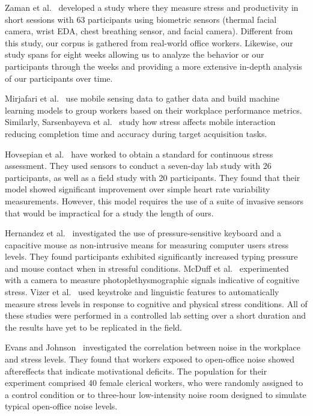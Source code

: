 Zaman et al.~\cite{Zaman19} developed a study where they measure stress and productivity in short sessions with 63 participants using biometric sensors (thermal facial camera, wrist EDA, chest breathing sensor, and facial camera). Different from this study, our corpus is gathered from real-world office workers. Likewise, our study spans for eight weeks allowing us to analyze the behavior or our participants through the weeks and providing a more extensive in-depth analysis of our participants over time.

Mirjafari et al.~\cite{Mirjafari19} use mobile sensing data to gather data and build machine learning models to group workers based on their workplace performance metrics. Similarly, Sarsenbayeva et al.~\cite{Sarsenbayeva19} study how stress affects mobile interaction reducing completion time and accuracy during target acquisition tasks.

Hovsepian et al.~\cite{Hovsepian15} have worked to obtain a standard for continuous stress assessment. They used sensors to conduct a seven-day lab study with 26 participants, as well as a field study with 20 participants. They found that their model showed significant improvement over simple heart rate variability measurements. However, this model requires the use of a suite of invasive sensors that would be impractical for a study the length of ours.

Hernandez et al.~\cite{Hernandez14} investigated the use of pressure-sensitive keyboard and a capacitive mouse as non-intrusive means for measuring computer users stress levels. They found participants exhibited significantly increased typing pressure and mouse contact when in stressful conditions. McDuff et al.~\cite{mcduff16} experimented with a camera to measure photoplethysmographic signals indicative of cognitive stress. Vizer et al.~\cite{vizer_automated_2009} used keystroke and linguistic features to automatically measure stress levels in response to cognitive and physical stress conditions. All of these studies were performed in a controlled lab setting over a short duration and the results have yet to be replicated in the field.

Evans and Johnson~\cite{evans00} investigated the correlation between noise in the workplace and stress levels. They found that workers exposed to open-office noise showed aftereffects that indicate motivational deficits. The population for their experiment comprised 40 female clerical workers, who were randomly assigned to a control condition or to three-hour low-intensity noise room designed to simulate typical open-office noise levels.

